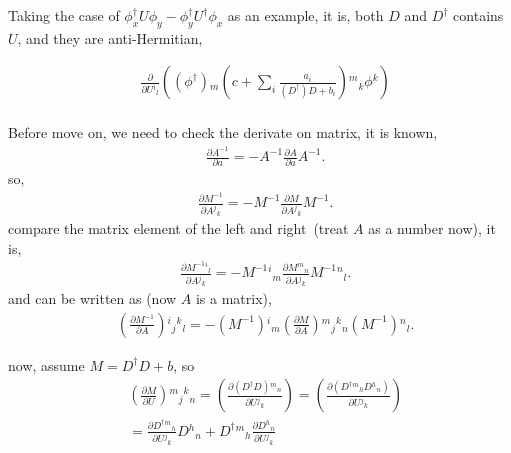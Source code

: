 Taking the case of $\phi _x^{\dagger} U\phi _y - \phi _y^{\dagger} U^{\dagger}\phi _x$ as an example, it is, both $D$ and $D^{\dagger}$ contains $U$, and they are anti-Hermitian,

\begin{equation}
\begin{split}
&\frac{\partial}{\partial U{}^i{}_l}\left((\phi ^{\dagger}){}_m \left(c+\sum _i\frac{a_i}{(D^{\dagger})  D+b_i}\right){}^m{}_k \phi{}^k\right)\\
\end{split}
\end{equation}

\begin{tcolorbox}
Before move on, we need to check the derivate on matrix, it is known,
\begin{equation}
\begin{split}
&\frac{\partial A^{-1}}{\partial a} = -A^{-1}\frac{\partial A}{\partial a} A^{-1}.
\end{split}
\end{equation}
so,
\begin{equation}
\begin{split}
&\frac{\partial M^{-1}}{\partial A{}^j{}_k} = -M^{-1}\frac{\partial M}{\partial A{}^j{}_k} M^{-1}.
\end{split}
\end{equation}
compare the matrix element of the left and right~(treat $A$ as a number now), it is,
\begin{equation}
\begin{split}
&\frac{\partial M^{-1}{}^i{}_l}{\partial A{}^j{}_k} = -M^{-1}{}^i{}_m\frac{\partial M{}^m{}_n}{\partial A{}^j{}_k} M^{-1}{}^n{}_l.
\end{split}
\end{equation}
and can be written as (now $A$ is a matrix),
\textcolor[rgb]{1,0,0}{
\begin{equation}
\begin{split}
&\left(\frac{\partial M^{-1}}{\partial A}\right){}^i{}_j{}^k{}_l= -(M^{-1}){}^i{}_m \left(\frac{\partial M}{\partial A}\right){}^m{}_j{}^k{}_n (M^{-1}){}^n{}_l.
\end{split}
\end{equation}
}
\end{tcolorbox}

now, assume $M=D^{\dagger}D+b$, so
\begin{equation}
\begin{split}
&\left(\frac{\partial M}{\partial U}\right){}^m{}_j{}^k{}_n = \left(\frac{\partial (D^{\dagger}D){}^m{}_n}{\partial U {}^j{}_k}\right)= \left(\frac{\partial (D^{\dagger}{}^m{}_h D{}^h{}_n)}{\partial U {}^j{}_k}\right)\\
&= \frac{\partial D^{\dagger}{}^m{}_h}{\partial U{}^j{}_k} D{}^h{}_n+D^{\dagger}{}^m{}_h \frac{\partial D{}^h{}_n}{\partial U{}^j{}_k}\\
\end{split}
\end{equation}

